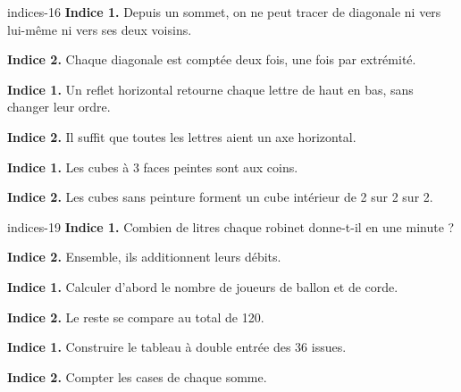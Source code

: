 \begin{blocEdition}{indices-16}
\textbf{Indice 1.} Depuis un sommet, on ne peut tracer de diagonale ni vers lui-même ni vers ses deux voisins.\par\medskip\textbf{Indice 2.} Chaque diagonale est comptée deux fois, une fois par extrémité.\par
{}\textbf{Indice 1.} Un reflet horizontal retourne chaque lettre de haut en bas, sans changer leur ordre.\par\medskip\textbf{Indice 2.} Il suffit que toutes les lettres aient un axe horizontal.\par
{}\textbf{Indice 1.} Les cubes à 3 faces peintes sont aux coins.\par\medskip\textbf{Indice 2.} Les cubes sans peinture forment un cube intérieur de 2 sur 2 sur 2.\par

\end{blocEdition}
\begin{blocEdition}{indices-19}
\textbf{Indice 1.} Combien de litres chaque robinet donne-t-il en une minute ?\par\medskip\textbf{Indice 2.} Ensemble, ils additionnent leurs débits.\par
{}\textbf{Indice 1.} Calculer d’abord le nombre de joueurs de ballon et de corde.\par\medskip\textbf{Indice 2.} Le reste se compare au total de 120.\par
{}\textbf{Indice 1.} Construire le tableau à double entrée des 36 issues.\par\medskip\textbf{Indice 2.} Compter les cases de chaque somme.\par

\end{blocEdition}
